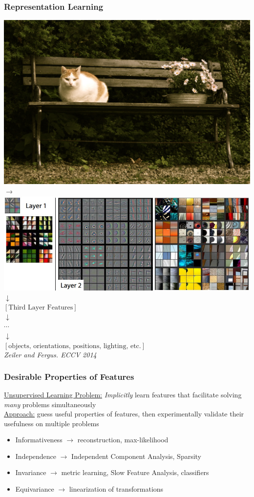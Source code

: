 \documentclass{beamer}
\begin{document}
\begin{frame} 
\frametitle{Representation Learning}
\includegraphics[scale=0.03]{./Figures/cat.jpg} $\rightarrow$ 
\includegraphics[scale=0.25]{./Figures/mattfeatures.jpeg}\\
\centering
$\downarrow$\\
$[\mbox{Third Layer Features}]$\\
$\downarrow$ \\
$\cdots$\\ 
$\downarrow$\\
\centering
$[\mbox{objects, orientations, positions, lighting, etc.}]$\\ \vspace{1cm} 
\emph{\tiny{Zeiler and Fergus. ECCV 2014}}
\end{frame} 

\begin{frame} 
\frametitle{Desirable Properties of Features}
\underline{Unsupervised Learning Problem:} \emph{Implicitly} learn features that facilitate solving \emph{many} problems simultaneously \\ \vspace{0.125cm}
\underline{Approach:} guess useful properties of features, then experimentally validate their usefulness on multiple problems
\begin{itemize}
\item{Informativeness $\rightarrow$ reconstruction, max-likelihood}
\item{Independence $\rightarrow$ Independent Component Analysis, Sparsity}
\item{Invariance $\rightarrow$ metric learning, Slow Feature Analysis, classifiers}
\item{Equivariance $\rightarrow$ linearization of transformations} 
\end{itemize} 
\end{frame} 
\end{document}
